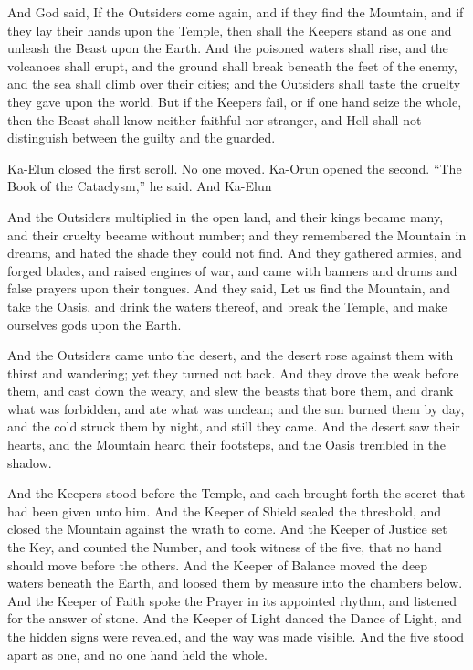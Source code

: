 \begin{scripture}
And God said, If the Outsiders come again, and if they find the Mountain, and if they lay their hands upon the Temple, then shall the Keepers stand as one and unleash the Beast upon the Earth.
And the poisoned waters shall rise, and the volcanoes shall erupt, and the ground shall break beneath the feet of the enemy, and the sea shall climb over their cities; and the Outsiders shall taste the cruelty they gave upon the world.
But if the Keepers fail, or if one hand seize the whole, then the Beast shall know neither faithful nor stranger, and Hell shall not distinguish between the guilty and the guarded.
\end{scripture}
 
Ka-Elun closed the first scroll. No one moved. Ka-Orun opened the second. ``The Book of the Cataclysm,'' he said. And Ka-Elun\par
 
\begin{scripture}
And the Outsiders multiplied in the open land, and their kings became many, and their cruelty became without number; and they remembered the Mountain in dreams, and hated the shade they could not find.
And they gathered armies, and forged blades, and raised engines of war, and came with banners and drums and false prayers upon their tongues.
And they said, Let us find the Mountain, and take the Oasis, and drink the waters thereof, and break the Temple, and make ourselves gods upon the Earth.
\end{scripture}
 
\begin{scripture}
And the Outsiders came unto the desert, and the desert rose against them with thirst and wandering; yet they turned not back.
And they drove the weak before them, and cast down the weary, and slew the beasts that bore them, and drank what was forbidden, and ate what was unclean; and the sun burned them by day, and the cold struck them by night, and still they came.
And the desert saw their hearts, and the Mountain heard their footsteps, and the Oasis trembled in the shadow.
\end{scripture}
 
\begin{scripture}
And the Keepers stood before the Temple, and each brought forth the secret that had been given unto him.
And the Keeper of Shield sealed the threshold, and closed the Mountain against the wrath to come.
And the Keeper of Justice set the Key, and counted the Number, and took witness of the five, that no hand should move before the others.
And the Keeper of Balance moved the deep waters beneath the Earth, and loosed them by measure into the chambers below.
And the Keeper of Faith spoke the Prayer in its appointed rhythm, and listened for the answer of stone.
And the Keeper of Light danced the Dance of Light, and the hidden signs were revealed, and the way was made visible.
And the five stood apart as one, and no one hand held the whole.
\end{scripture}
 
